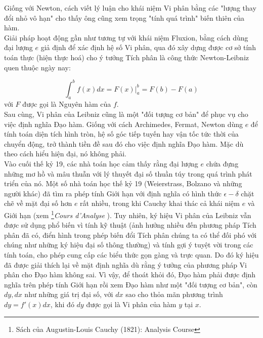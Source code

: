 \documentclass[a4paper,12pt]{article}
\begin{document}
Giống với Newton, cách viết lý luận cho khái niệm Vi phân bằng các "lượng thay đổi nhỏ vô hạn" cho thấy ông cũng xem trọng "tính quá trình" biến thiên của hàm.\\

Giải pháp hoạt động gần như tương tự với khái niệm Fluxion, bằng cách dùng đại lượng $e$ giả định để xác định hệ số Vi phân, qua đó xây dựng được cơ sở tính toán thực (hiện thực hoá) cho ý tưởng Tích phân là công thức Newton-Leibniz quen thuộc ngày nay:

$$ \int_{a}^{b} f(x)dx = F(x) \Big|_{a}^{b} = F(b) - F(a) $$
với $F$ được gọi là Nguyên hàm của $f$.\\

Sau cùng, Vi phân của Leibniz cũng là một "đối tượng cơ bản" để phục vụ cho việc định nghĩa Đạo hàm. Giống với cách Archimedes, Fermat, Newton dùng $e$ để tính toán diện tích hình tròn, hệ số góc tiếp tuyến hay vận tốc tức thời của chuyển động, trở thành tiền đề sau đó cho việc định nghĩa Đạo hàm. Mặc dù theo cách hiểu hiện đại, nó không phải.\\

Vào cuối thế kỷ 19, các nhà toán học cảm thấy rằng đại lượng $e$ chứa đựng những mơ hồ và mâu thuẫn với lý thuyết đại số thuần túy trong quá trình phát triển của nó. Một số nhà toán học thế kỷ 19 (Weierstrass, Bolzano và những người khác) đã tìm ra phép tính Giới hạn với định nghĩa có hình thức $\epsilon - \delta$ chặt chẽ về mặt đại số hơn $e$ rất nhiều, trong khi Cauchy khai thác cả khái niệm $e$ và Giới hạn (xem \footnote{Sách của Augustin-Louis Cauchy (1821): Analysis Course}\textit{Cours d'Analyse} ). Tuy nhiên, ký hiệu Vi phân của Leibniz vẫn được sử dụng phổ biến vì tính kỹ thuật (ảnh hưởng nhiều đến phương pháp Tích phân đã có, điển hình trong phép biến đổi Tích phân chúng ta có thể đối phó với chúng như những ký hiệu đại số thông thường) và tính gợi ý tuyệt vời trong các tính toán, cho phép cung cấp các biểu thức gọn gàng và trực quan. Do đó ký hiệu đã được giải thích lại về mặt định nghĩa dù rằng ý tưởng của phương pháp Vi phân cho Đạo hàm không sai. Vì vậy, để thoát khỏi đó, Đạo hàm phải được định nghĩa trên phép tính Giới hạn rồi xem Đạo hàm như một "đối tượng cơ bản", còn $dy, dx$ như những giá trị đại số, với $dx$ sao cho thỏa mãn phương trình $dy=f'(x)dx$, khi đó $dy$ được gọi là Vi phân của hàm $y$ tại $x$.
\end{document}
